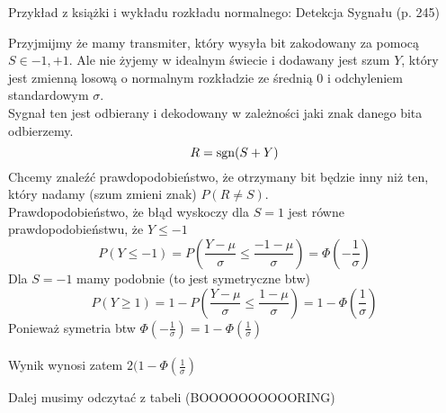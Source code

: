 Przykład z książki i wykładu rozkładu normalnego: Detekcja Sygnału (p. 245)

\begin{exercise}
\end{exercise}
Przyjmijmy że mamy transmiter, który wysyła bit zakodowany za pomocą
\( S \in {-1, +1}\). Ale nie żyjemy w idealnym świecie i dodawany jest szum \( Y\), który jest zmienną losową o normalnym rozkładzie ze średnią 0 i odchyleniem standardowym \( \sigma \). \\
Sygnał ten jest odbierany i dekodowany w zależności jaki znak danego bita odbierzemy. \[ R = \operatorname{sgn}(S + Y)\]
Chcemy znaleźć prawdopodobieństwo, że otrzymany bit będzie inny niż ten, który nadamy (szum zmieni znak) \(P(R \neq S)\).\\

Prawdopodobieństwo, że błąd wyskoczy dla \( S = 1\) jest równe prawdopodobieństwu, że \( Y \leq -1 \)
\[
	P(Y \leq -1) = P \left( \frac{Y - \mu}{\sigma} \leq \frac{-1 - \mu}{\sigma} \right) = \Phi\left(-\frac{1}{\sigma}\right)
\]
Dla \( S = -1 \) mamy podobnie (to jest symetryczne btw)
\[
	P(Y \geq 1) = 1 - P \left( \frac{Y - \mu}{\sigma} \leq \frac{1 - \mu}{\sigma} \right) = 1 - \Phi\left(\frac{1}{\sigma}\right)
\]
Ponieważ symetria btw \( \Phi(-\frac{1}{\sigma}) = 1 - \Phi(\frac{1}{\sigma})\) \\ \\
Wynik wynosi zatem \( 2(1 - \Phi(\frac{1}{\sigma})\)

Dalej musimy odczytać z tabeli (BOOOOOOOOOORING)